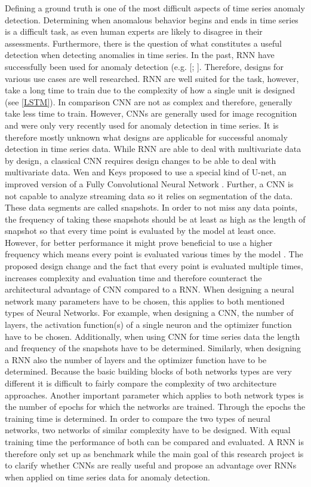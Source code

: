 Defining a ground truth is one of the most difficult aspects of time series anomaly detection. Determining when anomalous behavior begins and ends in time series is a difficult task, as even human experts are likely to disagree in their assessments. Furthermore, there is the question of what constitutes a useful detection when detecting anomalies in time series.
In the past, RNN have successfully been used for anomaly detection (e.g. [\parencite{Malhotra2015}; \parencite{Fan2016}]. Therefore, designs for various use cases are well researched. RNN are well suited for the task, however, take a long time to train due to the complexity of how a single unit is designed (see \ref{LSTM}). In comparison CNN are not as complex and therefore, generally take less time to train. However, CNNs are generally used for image recognition and were only very recently used for anomaly detection in time series. It is therefore mostly unknown what designs are applicable for successful anomaly detection in time series data. %
While RNN are able to deal with multivariate data by design, a classical CNN requires design changes to be able to deal with multivariate data. Wen and Keys \parencite*{Wen2019} proposed to use a special kind of U-net, an improved version of a Fully Convolutional Neural Network \parencite{Ronneberger2015}.
Further, a CNN is not capable to analyze streaming data so it relies on segmentation of the data. These data segments are called snapshots. In order to not miss any data points, the frequency of taking these snapshots should be at least as high as the length of snapshot so that every time point is evaluated by the model at least once. However, for better performance it might prove beneficial to use a higher frequency which means every point is evaluated various times by the model \parencite{Wen2019}. The proposed design change and the fact that every point is evaluated multiple times, increases complexity and evaluation time and therefore counteract the architectural advantage of CNN compared to a RNN. 
When designing a neural network many parameters have to be chosen, this applies to both mentioned types of Neural Networks. For example, when designing a CNN, the number of layers, the activation function(s) of a single neuron and the optimizer function have to be chosen. Additionally, when using CNN for time series data the length and frequency of the snapshots have to be determined. Similarly, when designing a RNN also the number of layers and the optimizer function have to be determined. Because the basic building blocks of both networks types are very different it is difficult to fairly compare the complexity of two architecture approaches. Another important parameter which applies to both network types is the number of epochs for which the networks are trained. Through the epochs the training time is determined. In order to compare the two types of neural networks, two networks of similar complexity have to be designed. With equal training time the performance of both can be compared and evaluated. A RNN is therefore only set up as benchmark while the main goal of this research project is to clarify whether CNNs are really useful and propose an advantage over RNNs when applied on time series data for anomaly detection.

